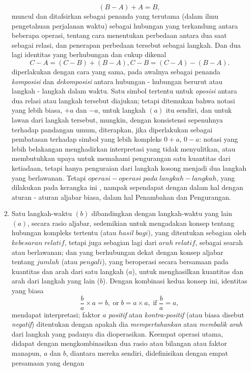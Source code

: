 \documentclass[a4paper, 12pt]{book}
\begin{document}
\begin{enumerate}
\[
(B - A) + A = B,
\]
muncul dan ditafsirkan sebagai penanda yang terutama (dalam ilmu pengetahuan 
perjalanan waktu) sebagai hubungan yang terkandung antara beberapa operasi,
tentang  cara menentukan perbedaan antara dua saat sebagai relasi, dan 
penerapan perbedaan tersebut sebagai langkah. Dan dua lagi identitas yang 
berhubungan dan cukup dikenal
\[
C - A = (C - B) + (B - A), C - B = (C - A) - (B - A).
\]
diperlakukan dengan cara yang sama, pada awalnya sebagai penanda 
\textit{komposisi} dan \textit{dekomposisi} antara hubungan - hubungan berurut
atau langkah - langkah dalam waktu. Satu simbol tertentu untuk \textit{oposisi}
antara dua relasi atau langkah tersebut diajukan; tetapi ditemukan bahwa
notasi yang lebih biasa, $+a$ dan $-a$, untuk langkah $(a)$ itu sendiri, dan
untuk lawan dari langkah tersebut, mungkin, dengan konsistensi sepenuhnya 
terhadap pandangan umum, diterapkan, jika diperlakukan sebagai pembatasan
terhadap simbol yang lebih kompleks $0 + a$, $0 - a$: notasi yang lebih 
belakangan menghadirkan interpretasi yang tidak menyulitkan, atau membutuhkan
upaya untuk memahami pengurangan satu kuantitas dari ketiadaan, tetapi hanya
penguraian dari langkah kosong menjadi dua langkah yang berlawanan. Tetapi 
$operasi - operasi \; pada \; langkah - langkah$, yang dilakukan pada kerangka ini
, nampak sependapat dengan dalam hal dengan aturan - aturan aljabar biasa, 
dalam hal Penambahan dan Pengurangan.
\item Satu langkah-waktu $(b)$ dibandingkan dengan langkah-waktu yang lain
$(a)$, secara rasio aljabar, sedemikian untuk mengadakan konsep tentang
hubungan kompleks tertentu (atau $hasil\; bagi$), yang ditentukan sebagian oleh
$kebesaran\; relatif$, tetapi juga sebagian lagi dari $arah\; relatif$, sebagai
searah atau berlawanan; dan yang berhubungan dekat dengan konsep aljabar 
tentang $jumlah$ (atau $pengali$), yang beroperasi secara bersamaan pada
kuantitas dan arah dari satu langkah ($a$), untuk 
menghasilkan kuantitas dan arah dari langkah yang lain ($b$). Dengan kombinasi
kedua konsep ini, identitas yang biasa
\[
\frac{b}{a} \times a = b, \; \text{or} \;  b = a \times a, \;\text{if} \; \frac{b}{a}=a,
\] 
mendapat interpretasi; faktor $a$ \textit{positif} atau 
\textit{kontra-positif} (atau biasa disebut \textit{negatif}) ditentukan dengan
apakah dia \textit{mempertahankan} atau \textit{membalik} \textit{arah} dari
langkah yang padanya dia dioperasikan. Keempat operasi utama, didapat dengan 
mengkombinasikan dua rasio atau bilangan atau faktor manapun, $a$ dan $b$, 
diantara mereka sendiri, didefinisikan dengan empat persamaan yang dengan

\end{enumerate}
\end{document}
